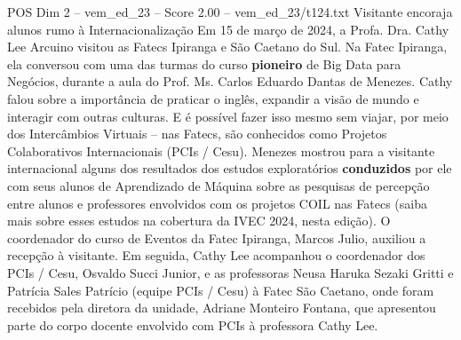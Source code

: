 \begin{textsample}{POS Dim 2 – vem\_ed\_23 – Score 2.00 – vem\_ed\_23/t124.txt}  \label{ex:f2_pos_116}
Visitante encoraja alunos rumo à Internacionalização Em 15 de março de 2024, a Profa.
Dra.
Cathy Lee Arcuino visitou as Fatecs Ipiranga e São Caetano do Sul.
Na Fatec Ipiranga, ela conversou com uma das turmas do curso \textbf{pioneiro} de Big Data para Negócios, durante a aula do Prof.
Ms.
Carlos Eduardo Dantas de Menezes.
Cathy falou sobre a importância de praticar o inglês, expandir a visão de mundo e interagir com outras culturas.
E é possível fazer isso mesmo sem viajar, por meio dos Intercâmbios Virtuais – nas Fatecs, são conhecidos como Projetos Colaborativos Internacionais (PCIs / Cesu).
Menezes mostrou para a visitante internacional alguns dos resultados dos estudos exploratórios \textbf{conduzidos} por ele com seus alunos de Aprendizado de Máquina sobre as pesquisas de percepção entre alunos e professores envolvidos com os projetos COIL nas Fatecs (saiba mais sobre esses estudos na cobertura da IVEC 2024, nesta edição).
O coordenador do curso de Eventos da Fatec Ipiranga, Marcos Julio, auxiliou a recepção à visitante.
Em seguida, Cathy Lee acompanhou o coordenador dos PCIs / Cesu, Osvaldo Succi Junior, e as professoras Neusa Haruka Sezaki Gritti e Patrícia Sales Patrício (equipe PCIs / Cesu) à Fatec São Caetano, onde foram recebidos pela diretora da unidade, Adriane Monteiro Fontana, que apresentou parte do corpo docente envolvido com PCIs à professora Cathy Lee.

\end{textsample}
